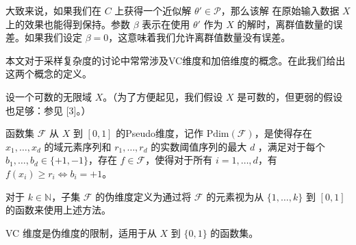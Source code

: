 大致来说，如果我们在 $C$ 上获得一个近似解 $\theta' \in \mathcal{P}$，那么该解
在原始输入数据 $X$ 上的效果也能得到保持。参数 $\beta$ 表示在使用 $\theta'$ 作为 $X$ 的解时，离群值数量的误
差。如果我们设定 $\beta = 0$，这意味着我们允许离群值数量没有误差。

本文对于采样复杂度的讨论中常常涉及VC维度和加倍维度的概念。在此我们给出这两个概念的定义。


\begin{definition}[VC dimension]
  设一个可数的无限域 \( X \)。（为了方便起见，我们假设 \( X \) 是可数的，但更弱的假设也足够：参见 [3]。）

函数集 \( \mathcal{F} \) 从 \( X \) 到 \([0,1]\) 的Pseudo维度，记作 \(\text{Pdim}(\mathcal{F})\)，是使得存在 \( x_1, \ldots, x_d \) 的域元素序列和 \( r_1, \ldots, r_d \) 的实数阈值序列的最大 \( d \) ，满足对于每个 \( b_1, \ldots, b_d \in \{+1, -1\}\)，存在 \( f \in \mathcal{F} \)，使得对于所有 \( i = 1, \ldots, d \)，有 \( f(x_i) \ge r_i \iff b_i = +1 \)。

对于 \( k \in \mathbb{N} \)，子集 \(\mathcal{F}\) 的伪维度定义为通过将 \(\mathcal{F}\) 的元素视为从 \(\{1, \ldots, k\}\) 到 \([0,1]\) 的函数来使用上述方法。

VC 维度是伪维度的限制，适用于从 \( X \) 到 \(\{0,1\}\) 的函数集。
\end{definition}






